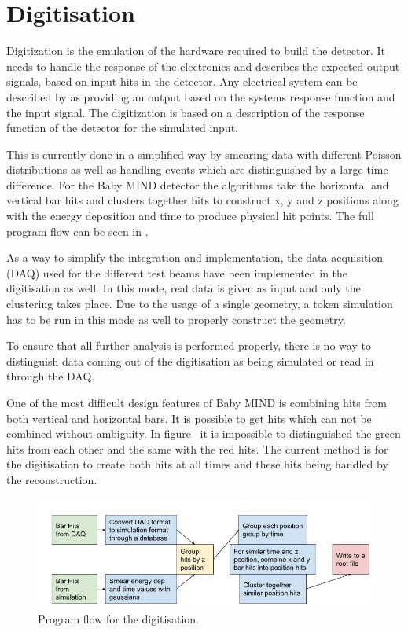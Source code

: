 \pagebreak
\section{Digitisation}
Digitization is the emulation of the hardware required to build the detector. It needs to handle the response of the electronics and describes the expected output signals, based on input hits in the detector. Any electrical system can be described by as providing an output based on the systems response function and the input signal. The digitization is based on a description of the response function of the detector for the simulated input.

This is currently done in a simplified way by smearing data with different Poisson distributions as well as handling events which are distinguished by a large time difference. For the Baby MIND detector the algorithms take the horizontal and vertical bar hits and clusters together hits to construct x, y and z positions along with the energy deposition and time to produce physical hit points. The full program flow can be seen in .

As a way to simplify the integration and implementation, the data acquisition (DAQ) used for the different test beams have been implemented in the digitisation as well. In this mode, real data is given as input and only the clustering takes place. Due to the usage of a single geometry, a token simulation has to be run in this mode as well to properly construct the geometry.

To ensure that all further analysis is performed properly, there is no way to distinguish data coming out of the digitisation as being simulated or read in through the DAQ.

One of the most difficult design features of Baby MIND is combining hits from both vertical and horizontal bars. It is possible to get hits which can not be combined without ambiguity. In figure~ it is impossible to distinguished the green hits from each other and the same with the red hits. The current method is for the digitisation to create both hits at all times and these hits being handled by the reconstruction.

\begin{figure}[h!]
\centering
\includegraphics[width=\textwidth]{figures/Digitisation.jpg}
\caption{Program flow for the digitisation.}
\label{fig:digi}
\end{figure}

